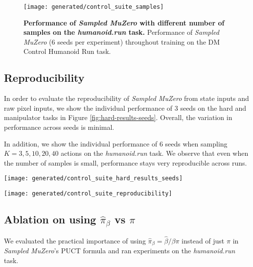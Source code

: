 \documentclass{article}
\newcommand{\smuzero}{\emph{Sampled MuZero}}
\newcommand{\sample}{\beta}
\begin{document}
\begin{figure}
\texttt{[image: generated/control\_suite\_samples]}
\vspace*{-7mm}
\caption[]{
\label{fig:control-suite-samples}
\textbf{Performance of \smuzero{} with different number of samples on the \emph{humanoid.run} task.} Performance of \smuzero{}  (6 seeds per experiment) throughout training on the DM Control Humanoid Run task.
}
\end{figure}

\subsection{Reproducibility}
In order to evaluate the reproducibility of \smuzero{} from state inputs and raw pixel inputs, we show the individual performance of 3 seeds on the hard and manipulator tasks in Figure \ref{fig:hard-results-seeds}. Overall, the variation in performance across seeds is minimal.

In addition, we show the individual performance of 6 seeds when sampling $K=3,5,10,20,40$ actions on the \emph{humanoid.run} task. We observe that even when the number of samples is small, performance stays very reproducible across runs.

\begin{figure*}
\texttt{[image: generated/control\_suite\_hard\_results\_seeds]}
\vspace*{-7mm}
\caption[]{
\label{fig:hard-results-seeds}
\textbf{Reproducibility of \smuzero{} from state and raw pixel inputs on the hard and manipulator tasks.} Performance of \smuzero{} (3 seeds per experiment) throughout training on the DM Control Humanoid Run task.
}
\end{figure*}

\begin{figure*}
\texttt{[image: generated/control\_suite\_reproducibility]}
\vspace*{-7mm}
\caption[]{
\label{fig:control-suite-reproducibility}
\textbf{Reproducibility of \smuzero{} on the \emph{humanoid.run} task with 3, 5, 10, 20 and 40 action samples.} Performance of \smuzero{} (6 seeds per experiment) throughout training on the DM Control Humanoid Run task.
}
\end{figure*}

\subsection{Ablation on using $\hat{\pi}_\sample$ vs $\pi$}
We evaluated the practical importance of using $\hat{\pi}_\sample=\hat{\sample}/\sample \pi$ instead of just $\pi$ in \smuzero{}'s PUCT formula and ran experiments on the \emph{humanoid.run} task.
\end{document}
